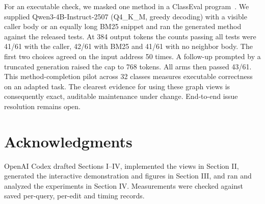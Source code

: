 \documentclass[conference]{IEEEtran}
\begin{document}
For an executable check, we masked one method in a ClassEval program~\cite{classeval}. We supplied Qwen3-4B-Instruct-2507 (Q4\_K\_M, greedy decoding) with a visible caller body or an equally long BM25 snippet and ran the generated method against the released tests. At 384 output tokens the counts passing all tests were 41/61 with the caller, 42/61 with BM25 and 41/61 with no neighbor body. The first two choices agreed on the input address 50 times. A follow-up prompted by a truncated generation raised the cap to 768 tokens. All arms then passed 43/61. This method-completion pilot across 32 classes measures executable correctness on an adapted task. The clearest evidence for using these graph views is consequently exact, auditable maintenance under change. End-to-end issue resolution remains open.

\section*{Acknowledgments}
OpenAI Codex drafted Sections I--IV, implemented the views in Section II, generated the interactive demonstration and figures in Section III, and ran and analyzed the experiments in Section IV. Measurements were checked against saved per-query, per-edit and timing records.


\end{document}
